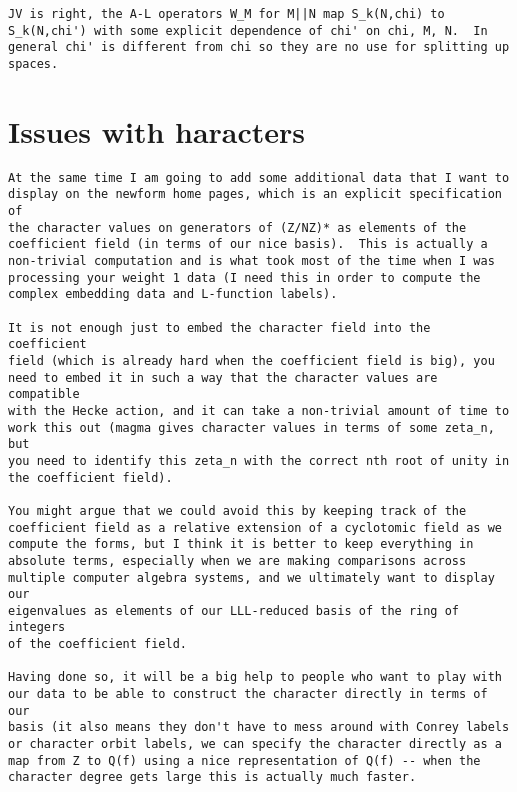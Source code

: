 \documentclass[11pt]{amsart}
\numberwithin{equation}{subsection}
\theoremstyle{definition}
\begin{document}
\begin{verbatim}
JV is right, the A-L operators W_M for M||N map S_k(N,chi) to S_k(N,chi') with some explicit dependence of chi' on chi, M, N.  In general chi' is different from chi so they are no use for splitting up spaces.
\end{verbatim}

\section{Issues with haracters}

\begin{verbatim}
At the same time I am going to add some additional data that I want to 
display on the newform home pages, which is an explicit specification of 
the character values on generators of (Z/NZ)* as elements of the 
coefficient field (in terms of our nice basis).  This is actually a 
non-trivial computation and is what took most of the time when I was 
processing your weight 1 data (I need this in order to compute the 
complex embedding data and L-function labels).

It is not enough just to embed the character field into the coefficient 
field (which is already hard when the coefficient field is big), you 
need to embed it in such a way that the character values are compatible 
with the Hecke action, and it can take a non-trivial amount of time to 
work this out (magma gives character values in terms of some zeta_n, but 
you need to identify this zeta_n with the correct nth root of unity in 
the coefficient field).

You might argue that we could avoid this by keeping track of the 
coefficient field as a relative extension of a cyclotomic field as we 
compute the forms, but I think it is better to keep everything in 
absolute terms, especially when we are making comparisons across 
multiple computer algebra systems, and we ultimately want to display our 
eigenvalues as elements of our LLL-reduced basis of the ring of integers 
of the coefficient field.

Having done so, it will be a big help to people who want to play with 
our data to be able to construct the character directly in terms of our 
basis (it also means they don't have to mess around with Conrey labels 
or character orbit labels, we can specify the character directly as a 
map from Z to Q(f) using a nice representation of Q(f) -- when the 
character degree gets large this is actually much faster.
\end{verbatim}
\end{document}
